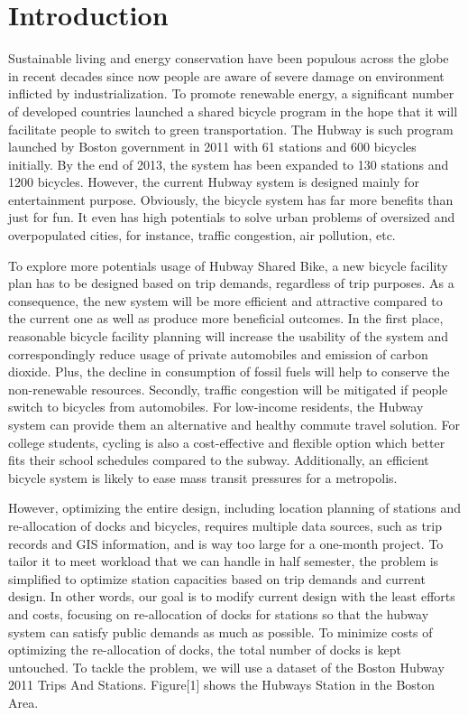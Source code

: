 \documentclass[journal, letterpaper]{IEEEtran}
\begin{document}
\section{Introduction}
\large
Sustainable living and energy conservation have been populous across the globe in recent decades since now people are aware of severe damage on environment inflicted by industrialization. To promote renewable energy, a significant number of developed countries launched a shared bicycle program in the hope that it will facilitate people to switch to green transportation. The Hubway is such program launched by Boston government in 2011 with 61 stations and 600 bicycles initially. By the end of 2013, the system has been expanded to 130 stations and 1200 bicycles. However, the current Hubway system is designed mainly for entertainment purpose. Obviously, the bicycle system has far more benefits than just for fun. It even has high potentials to solve urban problems of oversized and overpopulated cities, for instance, traffic congestion, air pollution, etc. 

To explore more potentials usage of Hubway Shared Bike, a new bicycle facility plan has to be designed based on trip demands, regardless of trip purposes. As a consequence, the new system will be more efficient and attractive compared to the current one as well as produce more beneficial outcomes. In the first place, reasonable bicycle facility planning will increase the usability of the system and correspondingly reduce usage of private automobiles and emission of carbon dioxide. Plus, the decline in consumption of fossil fuels will help to conserve the non-renewable resources. Secondly, traffic congestion will be mitigated if people switch to bicycles from automobiles. For low-income residents, the Hubway system can provide them an alternative and healthy commute travel solution. For college students, cycling is also a cost-effective and flexible option which better fits their school schedules compared to the subway. Additionally, an efficient bicycle system is likely to ease mass transit pressures for a metropolis.  

However, optimizing the entire design, including location planning of stations and re-allocation of docks and bicycles, requires multiple data sources, such as trip records and GIS information, and is way too large for a one-month project. To tailor it to meet workload that we can handle in half semester, the problem is simplified to optimize station capacities based on trip demands and current design. In other words, our goal is to modify current design with the least efforts and costs, focusing on re-allocation of docks for stations so that the hubway system can satisfy public demands as much as possible. To minimize costs of optimizing the re-allocation of docks, the total number of docks is kept untouched. To tackle the problem, we will use a dataset of the Boston Hubway 2011 Trips And Stations.  Figure[1] shows the Hubways Station in the Boston Area. 
\end{document}
